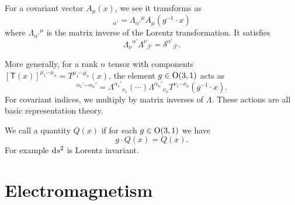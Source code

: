 For a covariant vector $A_{\mu}(x)$, we see it transforms as
\begin{equation}
[(g\cdot \vec{A})(x)]_{\alpha'} = {\Lambda_{\alpha'}}^{\mu}A_{\mu}(g^{-1}\cdot x)
\end{equation}
where ${\Lambda_{\alpha'}}^{\mu}$ is the matrix inverse of the Lorentz
transformation. It satisfies
\begin{equation}
{\Lambda_{\nu}}^{\alpha'}{\Lambda^{\nu}}_{\beta'} = {\delta^{\alpha'}}_{\beta'}.
\end{equation}

More generally, for a rank $n$ tensor with components $[\mathsf{T}(x)]^{\mu_{1}\cdots\mu_{n}}=T^{\mu_{1}\cdots\mu_{n}}(x)$,
the element $g\in\mathrm{O}(3,1)$ acts as
\begin{equation}
[(g\cdot \tens{T})(x)]^{\alpha_{1}'\cdots\alpha_{n}'}
= {\Lambda^{\alpha_{1}'}}_{\nu_{1}}(\cdots){\Lambda^{\alpha_{n}'}}_{\nu_{n}}
T^{\nu_{1}\cdots\nu_{n}}(g^{-1}\cdot x).
\end{equation}
For covariant indices, we multiply by matrix inverses of $\Lambda$.
These actions are all basic representation theory.

We call a quantity $Q(x)$  if for each $g\in\mathrm{O}(3,1)$
we have
\begin{equation}
g\cdot Q(x) = Q(x).
\end{equation}
For example $\mathrm{d} s^{2}$ is Lorentz invariant.

\section{Electromagnetism}

